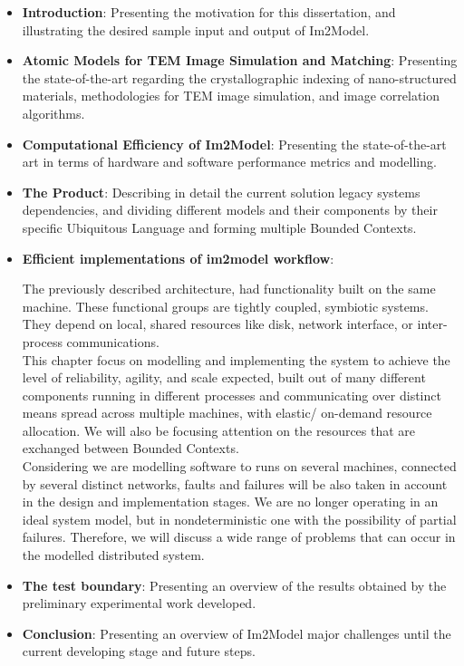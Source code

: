 \documentclass[
  oneside,
  11pt, a4paper,
  footinclude=true,
  headinclude=true,
  cleardoublepage=empty
]{scrbook}
\begin{document}
\begin{itemize}
    \item \textbf{Introduction}: Presenting the motivation for this dissertation, and illustrating the desired sample input and output of Im2Model.
    
     \item \textbf{Atomic Models for TEM Image Simulation and Matching}:
    Presenting the state-of-the-art regarding the  crystallographic indexing of nano-structured materials,  methodologies for TEM image simulation, and image correlation algorithms.
        
    \item \textbf{Computational Efficiency of Im2Model}:  Presenting the state-of-the-art art in terms of hardware and
software performance metrics and modelling.

    \item \textbf{The Product}:
    Describing in detail the current solution legacy systems dependencies, and dividing different models and their components by their specific Ubiquitous Language and forming multiple Bounded Contexts.\\
    
    
    
     
     
    
    \item \textbf{Efficient implementations of im2model workflow}:
    
    
    The previously described architecture, had functionality built on the same machine. These functional groups are tightly coupled, symbiotic systems. They depend on local, shared resources like disk, network interface, or inter-process communications. \\

    This chapter focus on modelling and implementing the system to achieve the level of reliability, agility, and scale expected, built out of many different components running in different processes and communicating over distinct means spread across multiple machines, 
    with elastic/ on-demand resource allocation. We will also be focusing attention on the resources that are exchanged between Bounded Contexts.\\
    Considering we are modelling software to runs on several machines, connected by several distinct networks, faults and failures will be also taken in account in the design and implementation stages. We are no longer operating in an ideal system model, but in nondeterministic one with the possibility of partial failures. Therefore, we will discuss a wide range of problems that can occur in the modelled distributed system.    

    
        \item \textbf{The test boundary}:  Presenting an overview of the  results obtained by
the preliminary experimental work developed.

            \item \textbf{Conclusion}: Presenting an overview of  Im2Model major challenges until the current developing stage and future steps.


\end{itemize}
\end{document}
